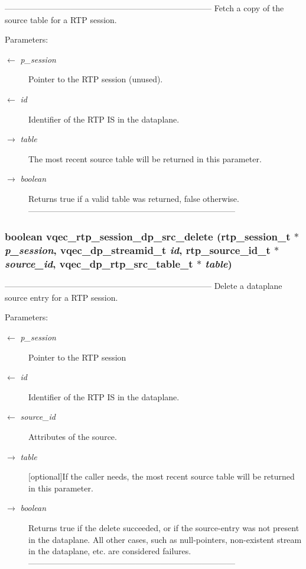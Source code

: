 --------------------------------------------------------------------------- Fetch a copy of the source table for a RTP session.

\begin{Desc}
\item[Parameters:]
\begin{description}
\item[\mbox{$\leftarrow$} {\em p\_\-session}]Pointer to the RTP session (unused). \item[\mbox{$\leftarrow$} {\em id}]Identifier of the RTP IS in the dataplane. \item[\mbox{$\rightarrow$} {\em table}]The most recent source table will be returned in this parameter. \item[\mbox{$\rightarrow$} {\em boolean}]Returns true if a valid table was returned, false otherwise. --------------------------------------------------------------------------- \end{description}
\end{Desc}
\subsubsection{\setlength{\rightskip}{0pt plus 5cm}boolean vqec\_\-rtp\_\-session\_\-dp\_\-src\_\-delete (rtp\_\-session\_\-t $\ast$ {\em p\_\-session}, vqec\_\-dp\_\-streamid\_\-t {\em id}, rtp\_\-source\_\-id\_\-t $\ast$ {\em source\_\-id}, vqec\_\-dp\_\-rtp\_\-src\_\-table\_\-t $\ast$ {\em table})}\label{vqec__rtp_8c_d9af1c970be1aa9934b5b854dc2e7b14}


--------------------------------------------------------------------------- Delete a dataplane source entry for a RTP session.

\begin{Desc}
\item[Parameters:]
\begin{description}
\item[\mbox{$\leftarrow$} {\em p\_\-session}]Pointer to the RTP session \item[\mbox{$\leftarrow$} {\em id}]Identifier of the RTP IS in the dataplane. \item[\mbox{$\leftarrow$} {\em source\_\-id}]Attributes of the source. \item[\mbox{$\rightarrow$} {\em table}][optional]If the caller needs, the most recent source table will be returned in this parameter. \item[\mbox{$\rightarrow$} {\em boolean}]Returns true if the delete succeeded, or if the source-entry was not present in the dataplane. All other cases, such as null-pointers, non-existent stream in the dataplane, etc. are considered failures. --------------------------------------------------------------------------- \end{description}
\end{Desc}
